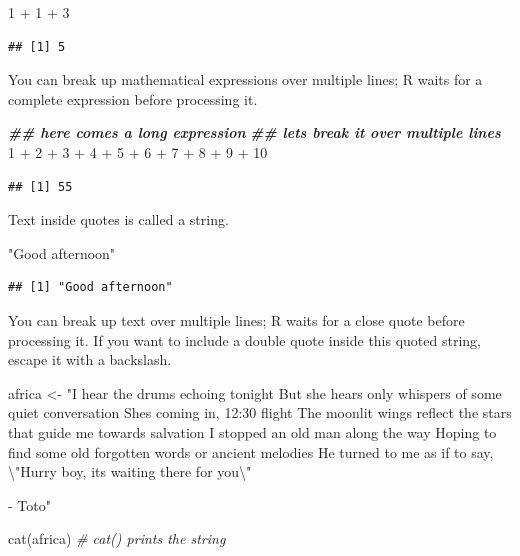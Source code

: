 \documentclass[
  oneside]{book}
\newenvironment{Shaded}{\begin{snugshade}}{\end{snugshade}}
\newcommand{\CommentTok}[1]{\textcolor[rgb]{0.56,0.35,0.01}{\textit{#1}}}
\newcommand{\DecValTok}[1]{\textcolor[rgb]{0.00,0.00,0.81}{#1}}
\newcommand{\DocumentationTok}[1]{\textcolor[rgb]{0.56,0.35,0.01}{\textbf{\textit{#1}}}}
\newcommand{\FunctionTok}[1]{\textcolor[rgb]{0.00,0.00,0.00}{#1}}
\newcommand{\NormalTok}[1]{#1}
\newcommand{\OtherTok}[1]{\textcolor[rgb]{0.56,0.35,0.01}{#1}}
\newcommand{\SpecialCharTok}[1]{\textcolor[rgb]{0.00,0.00,0.00}{#1}}
\newcommand{\StringTok}[1]{\textcolor[rgb]{0.31,0.60,0.02}{#1}}
\begin{document}
\begin{Shaded}
\begin{Highlighting}[]
\DecValTok{1} \SpecialCharTok{+} \DecValTok{1} \SpecialCharTok{+} \DecValTok{3}
\end{Highlighting}
\end{Shaded}

\begin{verbatim}
## [1] 5
\end{verbatim}

You can break up mathematical expressions over multiple lines; R waits for a complete expression before processing it.

\begin{Shaded}
\begin{Highlighting}[]
\DocumentationTok{\#\# here comes a long expression}
\DocumentationTok{\#\# let\textquotesingle{}s break it over multiple lines}
\DecValTok{1} \SpecialCharTok{+} \DecValTok{2} \SpecialCharTok{+} \DecValTok{3} \SpecialCharTok{+} \DecValTok{4} \SpecialCharTok{+} \DecValTok{5} \SpecialCharTok{+} \DecValTok{6} \SpecialCharTok{+}
    \DecValTok{7} \SpecialCharTok{+} \DecValTok{8} \SpecialCharTok{+} \DecValTok{9} \SpecialCharTok{+}
    \DecValTok{10}
\end{Highlighting}
\end{Shaded}

\begin{verbatim}
## [1] 55
\end{verbatim}

Text inside quotes is called a string.

\begin{Shaded}
\begin{Highlighting}[]
\StringTok{"Good afternoon"}
\end{Highlighting}
\end{Shaded}

\begin{verbatim}
## [1] "Good afternoon"
\end{verbatim}

You can break up text over multiple lines; R waits for a close quote before processing it. If you want to include a double quote inside this quoted string, escape it with a backslash.

\begin{Shaded}
\begin{Highlighting}[]
\NormalTok{africa }\OtherTok{\textless{}{-}} \StringTok{"I hear the drums echoing tonight  }
\StringTok{But she hears only whispers of some quiet conversation  }
\StringTok{She\textquotesingle{}s coming in, 12:30 flight  }
\StringTok{The moonlit wings reflect the stars that guide me towards salvation  }
\StringTok{I stopped an old man along the way  }
\StringTok{Hoping to find some old forgotten words or ancient melodies  }
\StringTok{He turned to me as if to say, }\SpecialCharTok{\textbackslash{}"}\StringTok{Hurry boy, it\textquotesingle{}s waiting there for you}\SpecialCharTok{\textbackslash{}"}

\StringTok{{-} Toto"}

\FunctionTok{cat}\NormalTok{(africa) }\CommentTok{\# cat() prints the string}
\end{Highlighting}
\end{Shaded}
\end{document}
